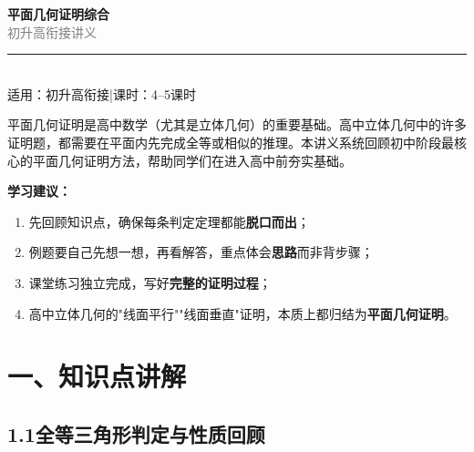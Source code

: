 \documentclass[12pt, a4paper]{ctexart}
\begin{document}
\begin{center}
{\Huge\bfseries\textcolor{mainblue}{平面几何证明综合}}\\[12pt]
{\Large\textcolor{gray}{初升高衔接讲义}}\\[8pt]
\rule{0.6\textwidth}{1pt}\\[8pt]
{\normalsize 适用：初升高衔接\quad |\quad 课时：4--5课时}
\end{center}
\vspace{6pt}

\begin{knowledgebox}[写在前面]
平面几何证明是高中数学（尤其是立体几何）的重要基础。高中立体几何中的许多证明题，都需要在平面内先完成全等或相似的推理。本讲义系统回顾初中阶段最核心的平面几何证明方法，帮助同学们在进入高中前夯实基础。

\medskip
\noindent\textbf{学习建议：}
\begin{enumerate}[leftmargin=2em]
  \item 先回顾知识点，确保每条判定定理都能\textbf{脱口而出}；
  \item 例题要自己先想一想，再看解答，重点体会\textbf{思路}而非背步骤；
  \item 课堂练习独立完成，写好\textbf{完整的证明过程}；
  \item 高中立体几何的"线面平行""线面垂直"证明，本质上都归结为\textbf{平面几何证明}。
\end{enumerate}
\end{knowledgebox}

\vspace{4pt}

\section*{\textcolor{mainblue}{一、知识点讲解}}

\subsection*{1.1\quad 全等三角形判定与性质回顾}
\end{document}
